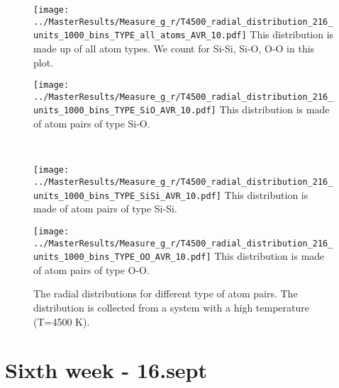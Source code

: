 \begin{figure}[H]
  \centering
  \begin{minipage}[b]{0.45\textwidth}
    \centering
    \texttt{[image: ../MasterResults/Measure\_g\_r/T4500\_radial\_distribution\_216\_units\_1000\_bins\_TYPE\_all\_atoms\_AVR\_10.pdf]}
    This distribution is made up of all atom types. We count for Si-Si, Si-O, O-O in this plot.
  \end{minipage}
  \hspace{0.5cm}
  \begin{minipage}[b]{0.45\textwidth}
    \centering
    \texttt{[image: ../MasterResults/Measure\_g\_r/T4500\_radial\_distribution\_216\_units\_1000\_bins\_TYPE\_SiO\_AVR\_10.pdf]}
    This distribution is made of atom pairs of type Si-O.
  \end{minipage} \\[0.4cm]
  \begin{minipage}[b]{0.45\textwidth}
    \centering
    \texttt{[image: ../MasterResults/Measure\_g\_r/T4500\_radial\_distribution\_216\_units\_1000\_bins\_TYPE\_SiSi\_AVR\_10.pdf]}
    This distribution is made of atom pairs of type Si-Si.
  \end{minipage}
  \hspace{0.5cm}
  \begin{minipage}[b]{0.45\textwidth}
    \centering
    \texttt{[image: ../MasterResults/Measure\_g\_r/T4500\_radial\_distribution\_216\_units\_1000\_bins\_TYPE\_OO\_AVR\_10.pdf]}
    This distribution is made of atom pairs of type O-O.
  \end{minipage} %
  \caption{The radial distributions for different type of atom pairs. The distribution is collected from a system with a high temperature (T=4500 K).}
  \label{g_r_T4500_10}
\end{figure}

\section{Sixth week - 16.sept}